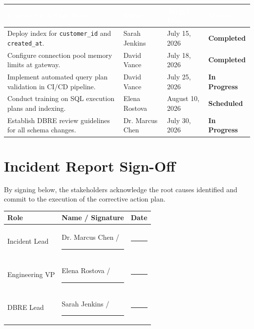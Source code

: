 \documentclass[11pt,a4paper]{article}
\begin{document}
\begin{tabularx}{\textwidth}{X >{\raggedright\arraybackslash\small}p{2.8cm} >{\raggedright\arraybackslash\small}p{2.2cm} >{\centering\arraybackslash\small}p{2.5cm}}
  \hline
  \rowcolor{PrimaryColor}
  \textcolor{white}{\textbf{Corrective Action Item}} & \textcolor{white}{\textbf{Owner}} & \textcolor{white}{\textbf{Target Date}} & \textcolor{white}{\textbf{Status}} \\
  \hline
  Deploy index for \texttt{customer\_id} and \texttt{created\_at}. & Sarah Jenkins & July 15, 2026 & \textcolor{SuccessColor}{\textbf{Completed}} \\
  \rowcolor{LightNeutral}
  Configure connection pool memory limits at gateway. & David Vance & July 18, 2026 & \textcolor{SuccessColor}{\textbf{Completed}} \\
  Implement automated query plan validation in CI/CD pipeline. & David Vance & July 25, 2026 & \textcolor{AccentColor}{\textbf{In Progress}} \\
  \rowcolor{LightNeutral}
  Conduct training on SQL execution plans and indexing. & Elena Rostova & August 10, 2026 & \textbf{Scheduled} \\
  Establish DBRE review guidelines for all schema changes. & Dr. Marcus Chen & July 30, 2026 & \textcolor{AccentColor}{\textbf{In Progress}} \\
  \hline
\end{tabularx}

\vspace{0.5cm}

\section{Incident Report Sign-Off}
By signing below, the stakeholders acknowledge the root causes identified and commit to the execution of the corrective action plan.

\vspace{0.2cm}
\begin{center}
\begin{tabularx}{\textwidth}{>{\raggedright\arraybackslash}X >{\raggedright\arraybackslash}X >{\raggedright\arraybackslash}X}
  \toprule
  \textbf{Role} & \textbf{Name / Signature} & \textbf{Date} \\
  \midrule
  Incident Lead & Dr. Marcus Chen / \rule{3.2cm}{0.5pt} & \rule{3.2cm}{0.5pt} \\
  \rowcolor{LightNeutral}
  Engineering VP & Elena Rostova / \rule{3.2cm}{0.5pt} & \rule{3.2cm}{0.5pt} \\
  DBRE Lead & Sarah Jenkins / \rule{3.2cm}{0.5pt} & \rule{3.2cm}{0.5pt} \\
  \bottomrule
\end{tabularx}
\end{center}
\end{document}
